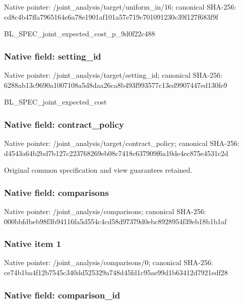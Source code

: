 \documentclass[10pt,a4paper]{article}
\begin{document}
Native pointer: /joint\_analysis/target/uniform\_in/16; canonical SHA-256: cd8c4b47ffa7965164e6a78e\allowbreak{}1901af101a57e719c7010912\allowbreak{}30c39f127f683f9f


BL\_SPEC\_joint\_expected\_c\allowbreak{}ost\_p\_9d0f22c488


\subsubsection{Native field: setting\_id}


Native pointer: /joint\_analysis/target/setting\_id; canonical SHA-256: 6288ab13c9690a1007108a5d\allowbreak{}8daa26ca8b493f993577c13e\allowbreak{}d9907447ed130fe9


BL\_SPEC\_joint\_expected\_cost


\subsubsection{Native field: contract\_policy}


Native pointer: /joint\_analysis/target/contract\_policy; canonical SHA-256: d4543a64b2bd7b127c223768\allowbreak{}269eb08c7418c637909f6a10\allowbreak{}de4ec875e4531c2d


Original common specification and view guarantees retained.


\subsubsection{Native field: comparisons}


Native pointer: /joint\_analysis/comparisons; canonical SHA-256: 000bbfdbeb98f3b94116fa5d\allowbreak{}554c4cd58d97379d0ebc8928\allowbreak{}954f39eb18b1b1af



\subsubsection{Native item 1}


Native pointer: /joint\_analysis/comparisons/0; canonical SHA-256: ce74b1ba4f12b7545c340dd5\allowbreak{}25329a748d45fd1c95ae99d1\allowbreak{}b63412d7921edf28



\subsubsection{Native field: comparison\_id}
\end{document}
